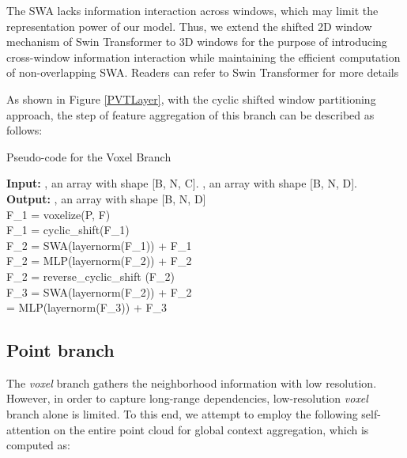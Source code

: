 \documentclass[10pt,twocolumn,letterpaper]{article}
\begin{document}
The SWA lacks information interaction across windows, which may limit the representation power of our model.
Thus, we extend the shifted 2D window mechanism of Swin Transformer \cite{liu2021swin} to 3D windows for the purpose of introducing cross-window information interaction while maintaining the efficient computation of non-overlapping SWA. Readers can refer to Swin Transformer for more details

As shown in Figure \ref{PVTLayer}, with the cyclic shifted window partitioning approach, the step of feature aggregation of this branch can be described as follows:

\begin{algorithm}[H]
    \caption{ Pseudo-code for the Voxel Branch}\label{Pseudo-code}\hspace*{0.02in} { \textbf{Input:} , an array with shape [B, N, C]. , an array with shape [B, N, D].} \\
    \hspace*{0.02in} { \textbf{Output:} , an array with shape [B, N, D]}\\
    \hspace*{0.04in} F\_1 = voxelize(P, F) \\
    \hspace*{0.04in} F\_1 = cyclic\_shift(F\_1)\\
    \hspace*{0.04in} F\_2 = SWA(layernorm(F\_1)) + F\_1\\
    \hspace*{0.04in} F\_2 = MLP(layernorm(F\_2)) + F\_2\\
    \hspace*{0.04in} F\_2 = reverse\_cyclic\_shift (F\_2)\\
    \hspace*{0.04in} F\_3 = SWA(layernorm(F\_2)) + F\_2\\
    \hspace*{0.04in}  = MLP(layernorm(F\_3)) + F\_3\\
\end{algorithm}

\subsection{Point branch}\label{3.2}
The \emph{voxel} branch gathers the neighborhood information with low resolution. However, in order to capture long-range dependencies, low-resolution \emph{voxel} branch alone is limited. To this end, we attempt to employ the following self-attention on the entire point cloud for global context aggregation, which is computed as:
\end{document}
